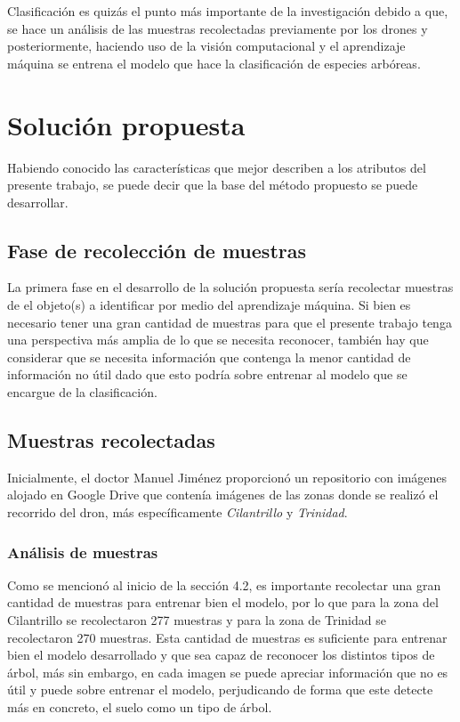 Clasificación es quizás el punto más importante de la investigación debido a que, se hace un análisis de las muestras recolectadas previamente por los drones y posteriormente, haciendo uso de la visión computacional y el aprendizaje máquina se entrena el modelo que hace la clasificación de especies arbóreas.


\chapter{Solución propuesta}
Habiendo conocido las características que mejor describen a los atributos del presente trabajo, se puede decir que la base del método propuesto se puede desarrollar.

\section{Fase de recolección de muestras}
La primera fase en el desarrollo de la solución propuesta sería recolectar muestras de el objeto(s) a identificar por medio del aprendizaje máquina. Si bien es necesario tener una gran cantidad de muestras para que el presente trabajo tenga una perspectiva más amplia de lo que se necesita reconocer, también hay que considerar que se necesita información que contenga la menor cantidad de información no útil dado que esto podría sobre entrenar al modelo que se encargue de la clasificación.

\newpage
\section{Muestras recolectadas}
Inicialmente, el doctor Manuel Jiménez proporcionó un repositorio con imágenes alojado en Google Drive que contenía imágenes de las zonas donde se realizó el recorrido del dron, más específicamente \emph{Cilantrillo} y \emph{Trinidad}.

\begin{figure}[h!]
 \centering
 \par
{}
\end{figure}

\newpage
\subsection{Análisis de muestras}
Como se mencionó al inicio de la sección 4.2, es importante recolectar una gran cantidad de muestras para entrenar bien el modelo, por lo que para la zona del Cilantrillo se recolectaron 277 muestras y para la zona de Trinidad se recolectaron 270 muestras. Esta cantidad de muestras es suficiente para entrenar bien el modelo desarrollado y que sea capaz de reconocer los distintos tipos de árbol, más sin embargo, en cada imagen se puede apreciar información que no es útil y puede sobre entrenar el modelo, perjudicando de forma que este detecte más en concreto, el suelo como un tipo de árbol.

